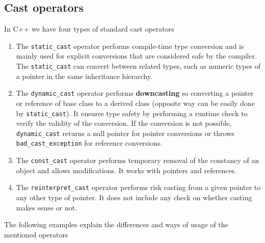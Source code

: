 \documentclass[../main]{subfiles}
\begin{document}
\subsection{Cast operators}
    In C++ we have four types of standard cast operators
\begin{enumerate}
    \item The \texttt{static\_cast} operator performs compile-time type conversion and is mainly used for explicit conversions that are considered safe by the compiler. The 
    \texttt{static\_cast} can convert between related types, such as numeric types of a pointer in the same inheritance hierarchy.
    \item The \texttt{dynamic\_cast} operator performs \textbf{downcasting} so converting a pointer or reference of base class to a derived class (opposite way can be easily done by \texttt{static\_cast}). It ensures type safety by performing a runtime check to
    verify the validity of the conversion. If the conversion is not possible, \texttt{dynamic\_cast} returns a null pointer for pointer conversions or throws \texttt{bad\_cast\_exception} for reference conversions.
    \item The \texttt{const\_cast} operator performs temporary removal of the constancy of an object and allows modifications. It works with pointers and references.
    \item The \texttt{reinterpret\_cast} operator performs risk casting from a given pointer to any other type of pointer. It does not include any check on whether casting makes sense or not.
\end{enumerate}
    The following examples explain the differences and ways of usage of the mentioned operators
\end{document}
